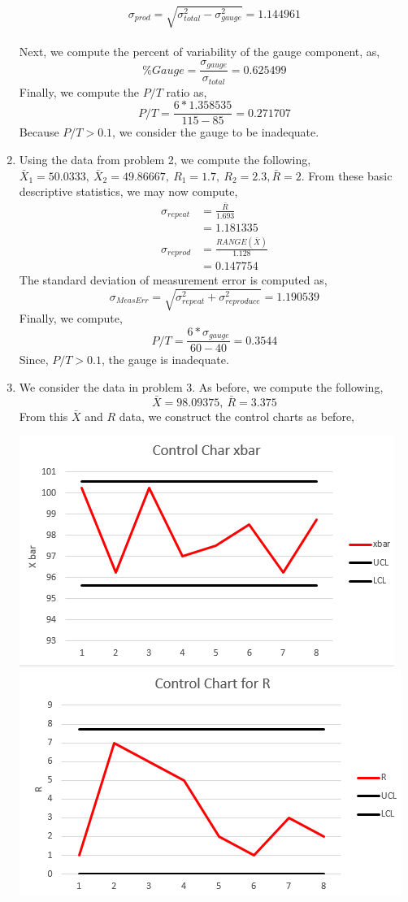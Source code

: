 \documentclass[letterpaper,10pt]{article}
\begin{document}
\begin{enumerate}
\[\sigma_{prod}=\sqrt{\sigma_{total}^2-\sigma_{gauge}^2}=1.144961\]\\
Next, we compute the percent of variability of the gauge component, as,
\[\%Gauge=\frac{\sigma_{gauge}}{\sigma_{total}}=0.625499\]
Finally, we compute the $P/T$ ratio as,
\[P/T=\frac{6*1.358535}{115-85}=0.271707\]
Because $P/T>0.1$, we consider the gauge to be inadequate.
\item Using the data from problem 2, we compute the following, $\bar{X}_1=50.0333,\ \bar{X}_2=49.86667,\ R_1=1.7,\ R_2=2.3, \bar{R}=2$. From these basic descriptive statistics, we may now compute,
\begin{align*}
\sigma_{repeat} &= \frac{\bar{R}}{1.693}\\
&=1.181335\\
\sigma_{reprod} &= \frac{RANGE(\bar{X})}{1.128}\\
&=0.147754
\end{align*}
The standard deviation of measurement error is computed as,
\[\sigma_{MeasErr}=\sqrt{\sigma_{repeat}^2+\sigma_{reproduce}^2}=1.190539\]
Finally, we compute,
\[P/T=\frac{6*\sigma_{gauge}}{60-40}=0.3544\]
Since, $P/T>0.1$, the gauge is inadequate.
\item We consider the data in problem 3. As before, we compute the following,
\[\bar{X}=98.09375,\ \bar{R}=3.375\]
From this $\bar{X}$ and $R$ data, we construct the control charts as before,
\begin{center}
\includegraphics[scale=0.85]{xbarcontrol3.png}\\
\includegraphics[scale=0.85]{rbarcontrol3.png}

\end{center}
\end{enumerate}
\end{document}
